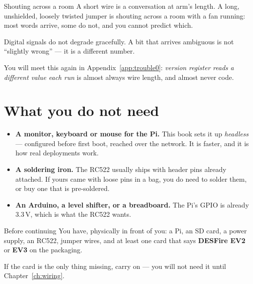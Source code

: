 \begin{analogy}{Shouting across a room}
A short wire is a conversation at arm's length. A long, unshielded, loosely
twisted jumper is shouting across a room with a fan running: most words arrive,
some do not, and you cannot predict which.

Digital signals do not degrade gracefully. A bit that arrives ambiguous is not
``slightly wrong'' --- it is a different number.
\end{analogy}

You will meet this again in Appendix~\ref{app:trouble0}: \emph{version register
reads a different value each run} is almost always wire length, and almost never
code.

\section{What you do not need}

\begin{itemize}
  \item \textbf{A monitor, keyboard or mouse for the Pi.} This book sets it up
        \emph{headless} --- configured before first boot, reached over the
        network. It is faster, and it is how real deployments work.
  \item \textbf{A soldering iron.} The RC522 usually ships with header pins
        already attached. If yours came with loose pins in a bag, you do need to
        solder them, or buy one that is pre-soldered.
  \item \textbf{An Arduino, a level shifter, or a breadboard.} The Pi's GPIO is
        already 3.3\,V, which is what the RC522 wants.
\end{itemize}

\begin{checkpoint}{Before continuing}
You have, physically in front of you: a Pi, an SD card, a power supply, an
RC522, jumper wires, and at least one card that says \textbf{DESFire EV2} or
\textbf{EV3} on the packaging.

If the card is the only thing missing, carry on --- you will not need it until
Chapter~\ref{ch:wiring}.
\end{checkpoint}

